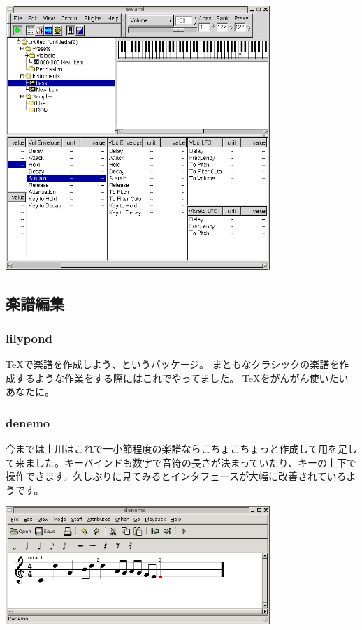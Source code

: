 \documentclass[mingoth,a4paper]{jsarticle}
\begin{document}
\includegraphics[width=10cm]{image200602/swami.png}

\subsection{楽譜編集}
\subsubsection{lilypond}

\TeX で楽譜を作成しよう、というパッケージ。
まともなクラシックの楽譜を作成するような作業をする際にはこれでやってました。
\TeX をがんがん使いたいあなたに。

\subsubsection{denemo}

今までは上川はこれで一小節程度の楽譜ならこちょこちょっと作成して用を足し
て来ました。キーバインドも数字で音符の長さが決まっていたり、キーの上下で
操作できます。久しぶりに見てみるとインタフェースが大幅に改善されているよ
うです。

\includegraphics[width=10cm]{image200602/denemo.png}
\end{document}
